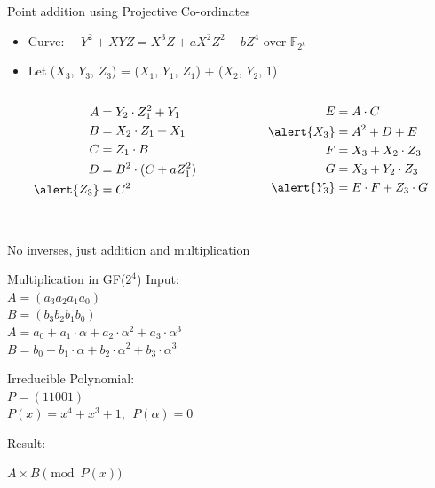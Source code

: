 \documentclass[xcolor=dvipsnames]{beamer}
\begin{document}
\begin{frame}{{Point addition using Projective Co-ordinates}}

\begin{itemize}
\item Curve: ~~$Y^2 + XYZ = X^3Z + aX^2Z^2 + bZ^4$ over $\mathbb{F}_{2^k}$
\item Let ($X_3$, $Y_3$, $Z_3$) = ($X_1$, $Y_1$, $Z_1$) + ($X_2$,
  $Y_2$, $1$)  
\end{itemize}

\begin{columns}
\begin{column}{0.2\textwidth}
\begin{align*}
A &= Y_2 \cdot Z_1^2 + Y_1 \\
B &= X_2 \cdot Z_1 + X_1 \\
C &= Z_1 \cdot B \\
D &= B^2 \cdot(C + a Z_1^2) \\
\alert{Z_3} &= C^2 
\end{align*}
\end{column} 

\begin{column}{.3\textwidth}
\begin{align*}
E &= A \cdot C  \\
\alert{X_3} &= A^2 + D + E  \\
F &= X_3 + X_2 \cdot Z_3 \\
G &= X_3 + Y_2\cdot Z_3 \\
\alert{Y_3} &= E\cdot F + Z_3 \cdot G
\end{align*}
\end{column}
\end{columns}

\ \\
No inverses, just addition and multiplication

\end{frame}




\begin{frame}{Multiplication in GF($2^4$)}
Input: \\
$A=(a_3a_2a_1a_0)$ \\
$B=(b_3b_2b_1b_0)$ \\
$A=a_0+a_1\cdot \alpha+a_2\cdot \alpha^2+a_3\cdot \alpha^3$\\
$B=b_0+b_1\cdot \alpha+b_2\cdot \alpha^2+b_3\cdot \alpha^3$
\bigskip

Irreducible Polynomial: \\
$P=(11001)$ \\
$P(x)=x^4+x^3+1, ~~ P(\alpha) = 0$
\bigskip

Result: 

$A\times B \pmod{ P(x) }$


\end{frame}
\end{document}
